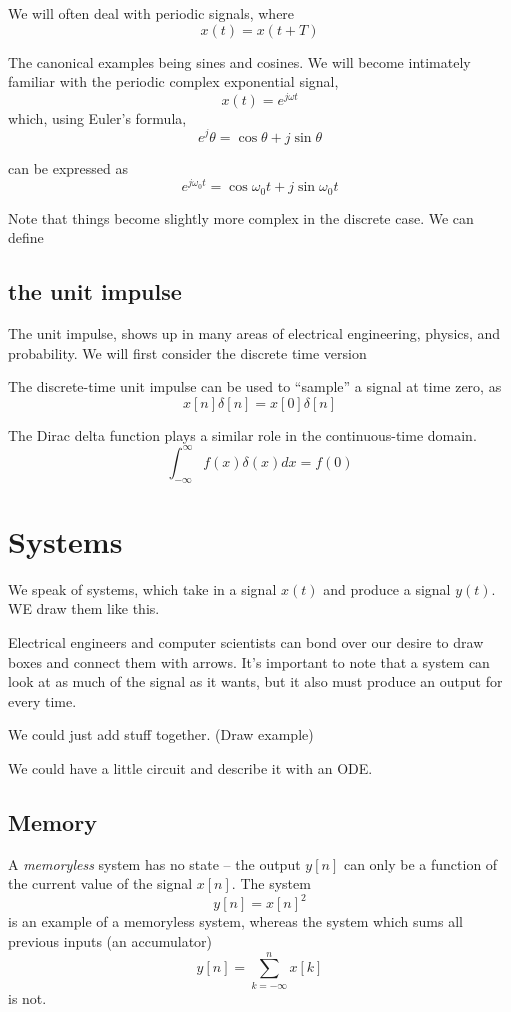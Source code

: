 We will often deal with periodic signals, where
\[
x(t) = x(t+T)
\]

The canonical examples being sines and cosines. We will become intimately 
familiar with the periodic complex exponential signal, 
\[
x(t) = e^{j \omega t}
\]
which, using Euler's formula, 
\[
e^j\theta = \cos \theta + j \sin \theta
\]

can be expressed as 
\[
e^{j \omega_0 t} = \cos \omega_0 t + j \sin \omega_0 t
\]

Note that things become slightly more complex in the discrete case. We can
define


\subsection{the unit impulse}
The unit impulse, shows up in many areas of electrical
engineering, physics, and probability. We will first consider the 
discrete time version

The discrete-time unit impulse can be used to ``sample'' a signal
at time zero, as
\[
x[n]\delta[n] = x[0]\delta[n]
\]

The Dirac delta function plays a similar role in the continuous-time domain.
\[
\int_{-\infty}^\infty f(x) \delta(x) dx = f(0)
\]

\section{Systems}

We speak of systems, which take in a signal $x(t)$ and produce a
signal $y(t)$. WE draw them like this.

Electrical engineers and computer scientists can bond over our desire
to draw boxes and connect them with arrows. It's important to note that
a system can look at as much of the signal as it wants, but it also
must produce an output for every time. 

We could just add stuff together. (Draw example)

We could have a little circuit and describe it with an ODE. 


\subsection{Memory}
A \textit{memoryless} system has no state -- the output $y[n]$ can only be a function
of the current value of the signal $x[n]$. The system 
\[
y[n] = x[n]^2
\]
is an example of a memoryless system, whereas the system which sums all previous
inputs (an accumulator) 
\[
y[n] = \sum_{k=-\infty}^n x[k]
\]
is not. 


